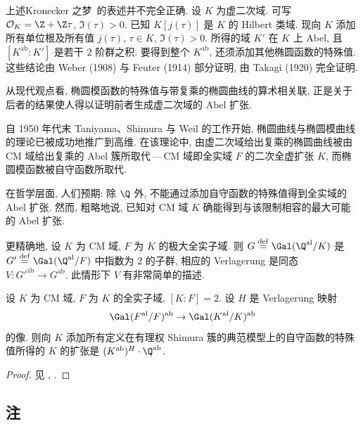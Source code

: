 上述\guillemotleft Kronecker 之梦\guillemotright\ 的表述并不完全正确. 设 $K$ 为虚二次域. 可写 $\mathcal{O}_K=\Z+\Z\tau$, $\Im(\tau)>0$. 已知 $K[j(\tau)]$ 是 $K$ 的 Hilbert 类域. 现向 $K$ 添加所有单位根及所有值 $j(\tau)$, $\tau\in K$, $\Im(\tau)>0$. 所得的域 $K'$ 在 $K$ 上 Abel, 且 $[K^{\mathrm{ab}}:K']$ 是若干 $2$ 阶群之积. 要得到整个 $K^{\mathrm{ab}}$, 还须添加其他椭圆函数的特殊值. 这些结论由 Weber (1908) 与 Feuter (1914) 部分证明, 由 Takagi (1920) 完全证明.

从现代观点看, 椭圆模函数的特殊值与带复乘的椭圆曲线的算术相关联, 正是关于后者的结果使人得以证明前者生成虚二次域的 Abel 扩张.

自 1950 年代末 Taniyama、Shimura 与 Weil 的工作开始, 椭圆曲线与椭圆模曲线的理论已被成功地推广到高维. 在该理论中, 由虚二次域给出复乘的椭圆曲线被由 CM 域给出复乘的 Abel 簇所取代\,---\,CM 域即全实域 $F$ 的二次全虚扩张 $K$, 而椭圆模函数被自守函数所取代.

在哲学层面, 人们预期: 除 $\Q$ 外, 不能通过添加自守函数的特殊值得到全实域的 Abel 扩张. 然而, 粗略地说, 已知对 CM 域 $K$ 确能得到与该限制相容的最大可能的 Abel 扩张.

更精确地, 设 $K$ 为 CM 域, $F$ 为 $K$ 的极大全实子域. 则 $G\overset{\mathrm{def}}{=}\Gal(\Q^{\mathrm{al}}/K)$ 是 $G'\overset{\mathrm{def}}{=}\Gal(\Q^{\mathrm{al}}/F)$ 中指数为 $2$ 的子群, 相应的 Verlagerung 是同态 $V\colon G'^{\mathrm{ab}}\to G^{\mathrm{ab}}$. 此情形下 $V$ 有非常简单的描述.

\begin{theorem}\label{thm:v.3.33}
设 $K$ 为 CM 域, $F$ 为 $K$ 的全实子域, $[K:F]=2$. 设 $H$ 是 Verlagerung 映射
\[
\Gal(F^{\mathrm{al}}/F)^{\mathrm{ab}}\to\Gal(K^{\mathrm{al}}/K)^{\mathrm{ab}}
\]
的像. 则向 $K$ 添加所有定义在有理权 Shimura 簇的典范模型上的自守函数的特殊值所得的 $K$ 的扩张是 $(K^{\mathrm{ab}})^H\cdot\Q^{\mathrm{ab}}$.
\end{theorem}

\begin{proof}
见 \cite{Wei1993}, \cite{Wei1994}.
\end{proof}

\subsection*{注}

